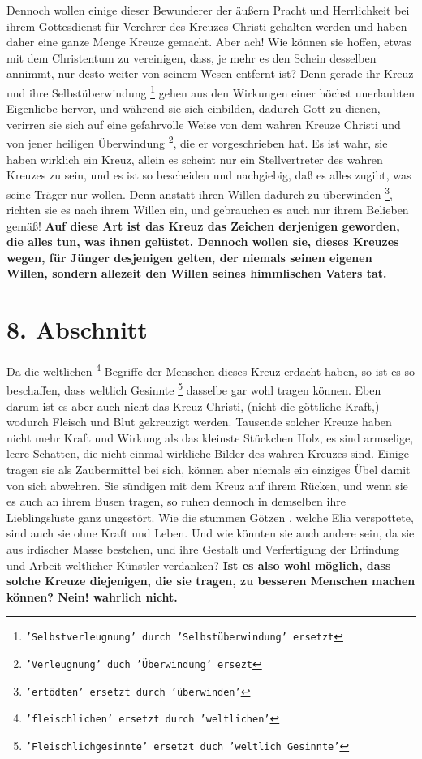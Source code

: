  Dennoch wollen einige dieser Bewunderer der äußern
Pracht und Herrlichkeit bei
ihrem Gottesdienst für Verehrer des Kreuzes Christi gehalten werden und haben
daher eine ganze Menge Kreuze gemacht. Aber ach! Wie können sie hoffen, etwas
mit dem Christentum zu vereinigen, dass, je mehr es den Schein desselben
annimmt, nur desto weiter von seinem Wesen entfernt ist? Denn gerade ihr Kreuz
und ihre Selbstüberwindung \footnote{\texttt{'Selbstverleugnung' durch 'Selbstüberwindung' ersetzt}}
gehen aus den Wirkungen einer höchst unerlaubten
Eigenliebe hervor, und während sie sich einbilden, dadurch
Gott zu dienen,
verirren sie sich auf eine gefahrvolle Weise von dem wahren Kreuze Christi und
von jener heiligen Überwindung \footnote{\texttt{'Verleugnung' duch 'Überwindung'
ersezt}}, die er vorgeschrieben hat. Es ist wahr, sie
haben wirklich ein Kreuz, allein es scheint nur ein Stellvertreter des wahren
Kreuzes zu sein, und es ist so bescheiden und
nachgiebig, daß es alles zugibt,
was seine Träger nur wollen. Denn anstatt ihren Willen dadurch zu überwinden
\footnote{\texttt{'ertödten' ersetzt durch 'überwinden'}},
richten sie es nach ihrem Willen ein, und gebrauchen es auch nur ihrem Belieben
gemäß! \label{ref:05_07_kreuz}
\textbf{Auf diese Art ist das Kreuz das Zeichen derjenigen geworden, die
alles
tun,  was ihnen gelüstet. Dennoch wollen sie, dieses Kreuzes wegen, für Jünger
desjenigen gelten, der niemals seinen eigenen Willen, sondern allezeit den
Willen seines himmlischen Vaters tat.}

\section{8. Abschnitt} \label{kap5_ab8}

 Da die weltlichen \footnote{\texttt{'fleischlichen' ersetzt durch 'weltlichen'}} Begriffe der Menschen dieses Kreuz erdacht haben, so ist es so beschaffen, dass weltlich Gesinnte \footnote{\texttt{'Fleischlichgesinnte' ersetzt
duch 'weltlich Gesinnte'}} dasselbe gar wohl tragen können. Eben
darum ist es aber auch nicht das Kreuz Christi, (nicht die göttliche Kraft,)
wodurch Fleisch und Blut gekreuzigt werden. Tausende solcher Kreuze haben nicht
mehr Kraft und Wirkung als das kleinste Stückchen Holz, es sind armselige,
leere Schatten, die nicht einmal wirkliche Bilder des wahren Kreuzes sind.
Einige tragen sie als Zaubermittel bei sich, können aber niemals ein einziges
Übel damit von sich abwehren. Sie sündigen mit dem Kreuz auf ihrem Rücken, und
wenn sie es auch an ihrem Busen tragen, so ruhen dennoch in demselben ihre
Lieblingslüste ganz ungestört. Wie die stummen Götzen , welche Elia  verspottete,
sind auch sie ohne Kraft und Leben. Und wie könnten sie auch andere sein, da sie
aus irdischer Masse bestehen, und ihre Gestalt und Verfertigung der Erfindung
und Arbeit weltlicher Künstler verdanken? \label{ref:05_08_kreuz}
\textbf{Ist es also wohl möglich, dass solche
Kreuze diejenigen, die sie tragen, zu besseren Menschen machen können? Nein!
wahrlich nicht.}

